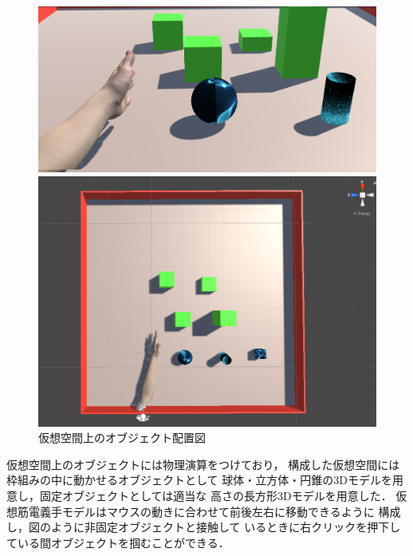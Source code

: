 \documentclass{ltjsarticle}
\begin{document}
		\begin{figure}[H]
		\centering
		\begin{minipage}{0.52\columnwidth}
		\centering
		\includegraphics[width = \columnwidth]{figs/gamescreen.png}
		\end{minipage}
		\hspace{0.05\columnwidth}
		\begin{minipage}{0.4\columnwidth}
		\centering
		\includegraphics[width = \columnwidth]{figs/fieldup.png}
		\end{minipage}
		\caption{仮想空間上のオブジェクト配置図}
		\label{fig:gamefield}
		\end{figure}
		\vspace{-20pt}

		仮想空間上のオブジェクトには物理演算をつけており，
		構成した仮想空間には枠組みの中に動かせるオブジェクトとして
		球体・立方体・円錐の3Dモデルを用意し，固定オブジェクトとしては適当な
		高さの長方形3Dモデルを用意した．
		仮想筋電義手モデルはマウスの動きに合わせて前後左右に移動できるように
		構成し，図のように非固定オブジェクトと接触して
		いるときに右クリックを押下している間オブジェクトを掴むことができる．
\end{document}
